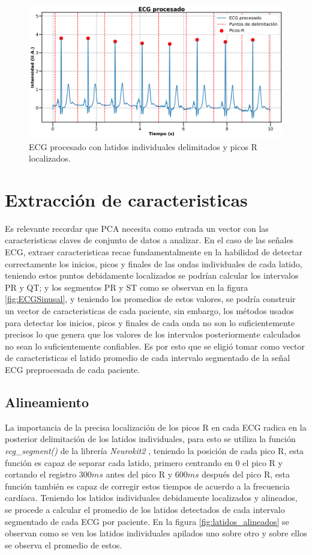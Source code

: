 \documentclass[12pt,letterpaper,oneside,openright]{book}
\begin{document}
\begin{figure}[h]
	\centering
	\includegraphics[width=0.85\linewidth]{Sem_1/figuras/ECG_procesado_10s_delimitado.png}
	\caption{ECG procesado con latidos individuales delimitados y picos R localizados.}
	\label{fig:ecg_delimitado}
\end{figure}

\section{Extracción de caracteristicas}

Es relevante recordar que PCA necesita como entrada un vector con las caracteristicas claves de conjunto de datos a analizar. En el caso de las señales ECG, extraer caracteristicas recae fundamentalmente en la habilidad de detectar correctamente los inicios, picos y finales de las ondas individuales de cada latido, teniendo estos puntos debidamente localizados se podrían calcular los intervalos PR y QT; y los segmentos PR y ST como se observan en la figura \ref{fig:ECGSinusal}, y teniendo los promedios de estos valores, se podría construir un vector de caracteristicas de cada paciente, sin embargo, los métodos usados para detectar los inicios, picos y finales de cada onda no son lo suficientemente precisos lo que genera que los valores de los intervalos posteriormente calculados no sean lo suficientemente confiables. Es por esto que se eligió tomar como vector de caracteristicas el latido promedio de cada intervalo segmentado de la señal ECG preprocesada de cada paciente.

\subsection{Alineamiento} 

La importancia de la precisa localización de los picos R en cada ECG radica en la posterior delimitación de los latidos individuales, para esto se utiliza la función \emph{ecg\_segment()} de la librería \emph{Neurokit2} \cite{neurokit21}, teniendo la posición de cada pico R, esta función es capaz de separar cada latido, primero centrando en $0$ el pico R y cortando el registro $300 ms$ antes del pico R y $600 ms$ después del pico R, esta función también es capaz de corregir estos tiempos de acuerdo a la frecuencia cardíaca. Teniendo los latidos individuales debidamente localizados y alineados, se procede a calcular el promedio de los latidos detectados de cada intervalo segmentado de cada ECG por paciente. En la figura \ref{fig:latidos_alineados} se observan como se ven los latidos individuales apilados uno sobre otro y sobre ellos se observa el promedio de estos.
\end{document}
